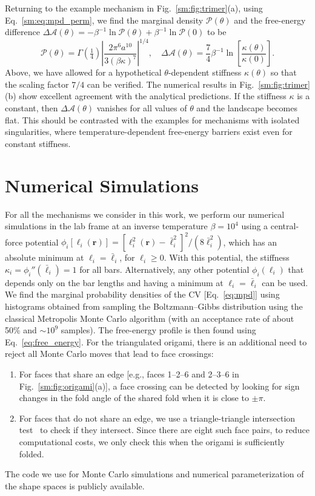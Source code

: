Returning to the example mechanism in Fig.~\ref{sm:fig:trimer}(a), using Eq.~\eqref{sm:eq:mpd_perm}, we find the marginal density $\mathscr{P}(\theta)$ and the free-energy difference $\Delta\mathscr{A}(\theta) = -\beta^{-1}\ln\mathscr{P}(\theta) + \beta^{-1}\ln\mathscr{P}(0)$ to be
%
\begin{equation}
  \mathscr{P}(\theta) = \Gamma\left(\tfrac{1}{4}\right)\left|\frac{2\pi^{6}a^{10}}{3(\beta\kappa)^{7}}\right|^{1/4},
  \quad
  \Delta\mathscr{A}(\theta) = \frac{7}{4}\beta^{-1}\ln\left[\frac{\kappa(\theta)}{\kappa(0)}\right].
  \label{sm:eq:trimer_free}
\end{equation}
%
Above, we have allowed for a hypothetical $\theta$-dependent stiffness $\kappa(\theta)$ so that the scaling factor $7/4$ can be verified.
The numerical results in Fig.~\ref{sm:fig:trimer}(b) show excellent agreement with the analytical predictions.
If the stiffness $\kappa$ is a constant, then $\Delta\mathscr{A}(\theta)$ vanishes for all values of $\theta$ and the landscape becomes flat.
This should be contrasted with the examples for mechanisms with isolated singularities, where temperature-dependent free-energy barriers exist even for constant stiffness.

\section{Numerical Simulations}
\label{sm:sec:numerics}

For all the mechanisms we consider in this work, we perform our numerical simulations in the lab frame at an inverse temperature $\beta = 10^{4}$ using a central-force potential $\phi_i[\ell_i(\bm{r})] = [\ell_i^{2}(\bm{r}) - \bar{\ell}_i^2]^2/(8\bar{\ell}_i^2)$, which has an absolute minimum at $\ell_i = \bar{\ell}_i$, for $\ell_i \geq 0$.
With this potential, the stiffness $\kappa_{i} = \phi_i''(\bar{\ell}_i) = 1$ for all bars.
Alternatively, any other potential $\phi_{i}(\ell_{i})$ that depends only on the bar lengths and having a minimum at $\ell_{i} = \bar{\ell}_{i}$ can be used.
We find the marginal probability densities of the CV [Eq.~\eqref{eq:mpd}] using histograms obtained from sampling the Boltzmann--Gibbs distribution using the classical Metropolis Monte Carlo algorithm (with an acceptance rate of about 50\% and $\sim 10^{9}$ samples).
The free-energy profile is then found using Eq.~\eqref{eq:free_energy}.
For the triangulated origami, there is an additional need to reject all Monte Carlo moves that lead to face crossings:
%
\begin{enumerate}
  \item For faces that share an edge [e.g., faces 1--2--6 and 2--3--6 in Fig.~\ref{sm:fig:origami}(a)], a face crossing can be detected by looking for sign changes in the fold angle of the shared fold when it is close to $\pm \pi$.
  \item For faces that do not share an edge, we use a triangle-triangle intersection test~\cite{tropp2006} to check if they intersect.
    Since there are eight such face pairs, to reduce computational costs, we only check this when the origami is sufficiently folded.
\end{enumerate}

The code we use for Monte Carlo simulations and numerical parameterization of the shape spaces is publicly available.

